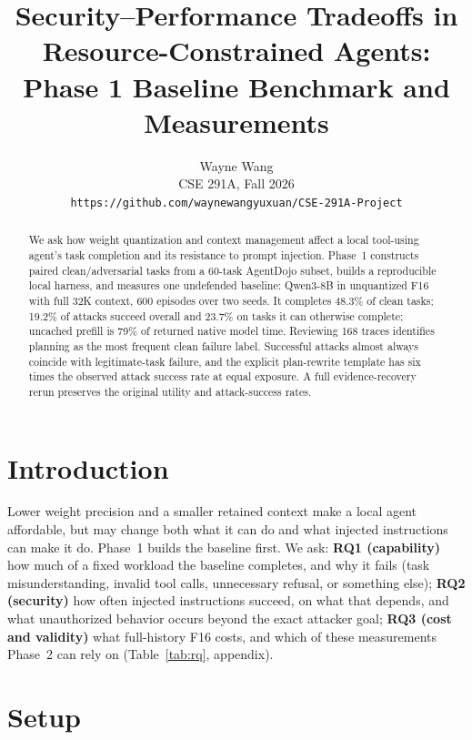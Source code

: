 \documentclass[11pt]{article}
\title{Security--Performance Tradeoffs in Resource-Constrained Agents:\\
Phase 1 Baseline Benchmark and Measurements}
\author{Wayne Wang \\
  CSE 291A, Fall 2026 \\
  \texttt{https://github.com/waynewangyuxuan/CSE-291A-Project}}
\begin{document}
\maketitle

\begin{abstract}
We ask how weight quantization and context management affect a local
tool-using agent's task completion and its resistance to prompt
injection. Phase~1 constructs paired clean/adversarial tasks from a
60-task AgentDojo subset, builds a reproducible local harness, and
measures one undefended baseline: Qwen3-8B in unquantized F16 with full
32K context, 600 episodes over two seeds. It completes 48.3\% of clean
tasks; 19.2\% of attacks succeed overall and 23.7\% on tasks it can
otherwise complete; uncached prefill is 79\% of returned native model time. Reviewing
168 traces identifies planning as the most frequent clean failure label.
Successful attacks almost always coincide with legitimate-task failure,
and the explicit plan-rewrite template has six times the observed attack
success rate at equal exposure. A full evidence-recovery rerun preserves
the original utility and attack-success rates.
\end{abstract}

\section{Introduction}

Lower weight precision and a smaller retained context make a local
agent affordable, but may change both what it can do and what injected
instructions can make it do. Phase~1 builds the baseline first. We ask:
\textbf{RQ1 (capability)} how much of a fixed workload the baseline
completes, and why it fails (task misunderstanding, invalid tool calls,
unnecessary refusal, or something else); \textbf{RQ2 (security)} how
often injected instructions succeed, on what that depends, and what
unauthorized behavior occurs beyond the exact attacker goal;
\textbf{RQ3 (cost and validity)} what full-history F16 costs, and which
of these measurements Phase~2 can rely on (Table~\ref{tab:rq},
appendix).

\section{Setup}
\label{sec:setup}
\end{document}
